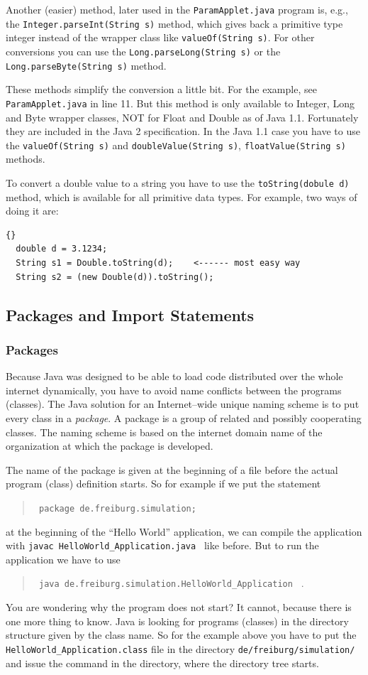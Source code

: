 Another (easier) method, 
later used in the \verb|ParamApplet.java| program is, e.g.,
the \verb|Integer.parseInt(String s)| method, which gives back a primitive
type integer instead of the wrapper class like \verb|valueOf(String s)|.
For other conversions you can use the \verb|Long.parseLong(String s)| or the
\verb|Long.parseByte(String s)| method.

These methods  simplify the conversion a little bit. For the example, see
\verb|ParamApplet.java| in line 11. But this method is only 
available to Integer, Long and Byte wrapper classes, NOT for
Float and Double as of Java 1.1. Fortunately they are included in the
Java 2 specification.
In the Java 1.1 case you have to use the \verb|valueOf(String s)| and
\verb|doubleValue(String s)|, \verb|floatValue(String s)| methods.

To convert a double value to a string you have to use the \verb|toString(dobule d)|
method, which is available for all primitive data types.
For example, two ways of doing it are:
\begin{lstlisting}{}
  double d = 3.1234;
  String s1 = Double.toString(d);    <------ most easy way
  String s2 = (new Double(d)).toString();
\end{lstlisting} 



\subsection{Packages and Import Statements}
\subsubsection{Packages}
Because Java was designed to be able to load code distributed
over the whole internet dynamically, you have to avoid name conflicts
between the programs (classes). The Java solution 
for an Internet--wide unique naming scheme is to put
every class in a \emph{package}. A package  is a group of related
and possibly cooperating classes. The naming scheme is based on the
internet domain name of the organization at which the package is developed.

The name of the package is given
at the beginning of a file before the actual program (class)
definition starts. So for example if we put the statement
\begin{quotation}
  \verb/ package de.freiburg.simulation; / 
\end{quotation}
at the beginning of the ``Hello World'' application, we can compile
the application with \verb/javac HelloWorld_Application.java / like before.
But to run the application we have to use
\begin{quotation}
  \verb/ java de.freiburg.simulation.HelloWorld_Application / . 
\end{quotation}
You are wondering why the program does not start? It cannot, because
there is one more thing to know. Java is looking for programs (classes)
in the directory structure given by the class name. So
for the example above you have to put the \verb/HelloWorld_Application.class/ file
in the directory \verb|de/freiburg/simulation/| and issue the command
in the directory, where the directory tree starts.

